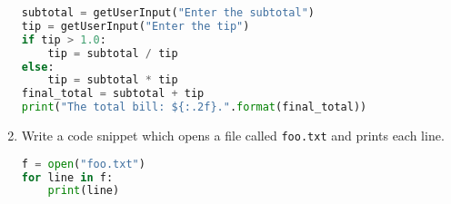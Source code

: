 \documentclass[letter,10pt]{article}
\begin{document}
\begin{enumerate}
\begin{lstlisting}[language=python]
subtotal = getUserInput("Enter the subtotal")
tip = getUserInput("Enter the tip")
if tip > 1.0:
    tip = subtotal / tip
else:
    tip = subtotal * tip
final_total = subtotal + tip
print("The total bill: ${:.2f}.".format(final_total))
    \end{lstlisting}

    \item Write a code snippet which opens a file called \texttt{foo.txt} and prints each line.
    \begin{lstlisting}[language=python]
f = open("foo.txt")
for line in f:
    print(line)
    \end{lstlisting}

\end{enumerate}
\end{document}

